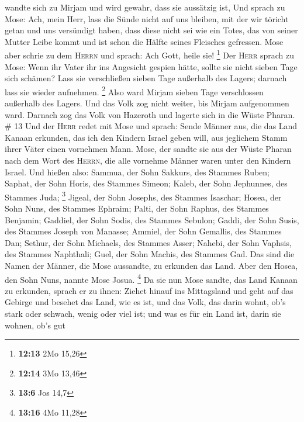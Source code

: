 wandte sich zu Mirjam und wird gewahr, dass sie aussätzig ist,
 Und sprach zu Mose: Ach, mein Herr, lass die Sünde nicht
auf uns bleiben, mit der wir töricht getan und uns versündigt haben,
 dass diese nicht sei wie ein Totes, das von seiner
Mutter Leibe kommt und ist schon die Hälfte seines Fleisches gefressen.
 Mose aber schrie zu dem \textsc{Herrn} und sprach: Ach
Gott, heile sie! \footnote{\textbf{12:13} 2Mo 15,26}  Der
\textsc{Herr} sprach zu Mose: Wenn ihr Vater ihr ins Angesicht gespien
hätte, sollte sie nicht sieben Tage sich schämen? Lass sie verschließen
sieben Tage außerhalb des Lagers; darnach lass sie wieder aufnehmen.
\footnote{\textbf{12:14} 3Mo 13,46}  Also ward Mirjam
sieben Tage verschlossen außerhalb des Lagers. Und das Volk zog nicht
weiter, bis Mirjam aufgenommen ward.  Darnach zog das
Volk von Hazeroth und lagerte sich in die Wüste Pharan. \# 13
 Und der \textsc{Herr} redet mit Mose und sprach:
 Sende Männer aus, die das Land Kanaan erkunden, das ich
den Kindern Israel geben will, aus jeglichem Stamm ihrer Väter einen
vornehmen Mann.  Mose, der sandte sie aus der Wüste Pharan
nach dem Wort des \textsc{Herrn}, die alle vornehme Männer waren unter
den Kindern Israel.  Und hießen also: Sammua, der Sohn
Sakkurs, des Stammes Ruben;  Saphat, der Sohn Horis, des
Stammes Simeon;  Kaleb, der Sohn Jephunnes, des Stammes
Juda; \footnote{\textbf{13:6} Jos 14,7}  Jigeal, der Sohn
Josephs, des Stammes Isaschar;  Hosea, der Sohn Nuns, des
Stammes Ephraim;  Palti, der Sohn Raphus, des Stammes
Benjamin;  Gaddiel, der Sohn Sodis, des Stammes Sebulon;
 Gaddi, der Sohn Susis, des Stammes Joseph von Manasse;
 Ammiel, der Sohn Gemallis, des Stammes Dan;
 Sethur, der Sohn Michaels, des Stammes Asser;
 Nahebi, der Sohn Vaphsis, des Stammes Naphthali;
 Guel, der Sohn Machis, des Stammes Gad. 
Das sind die Namen der Männer, die Mose aussandte, zu erkunden das Land.
Aber den Hosea, den Sohn Nuns, nannte Mose Josua. \footnote{\textbf{13:16}
  4Mo 11,28}  Da sie nun Mose sandte, das Land Kanaan zu
erkunden, sprach er zu ihnen: Ziehet hinauf ins Mittagsland und geht auf
das Gebirge  und besehet das Land, wie es ist, und das
Volk, das darin wohnt, ob's stark oder schwach, wenig oder viel ist;
 und was es für ein Land ist, darin sie wohnen, ob's gut
